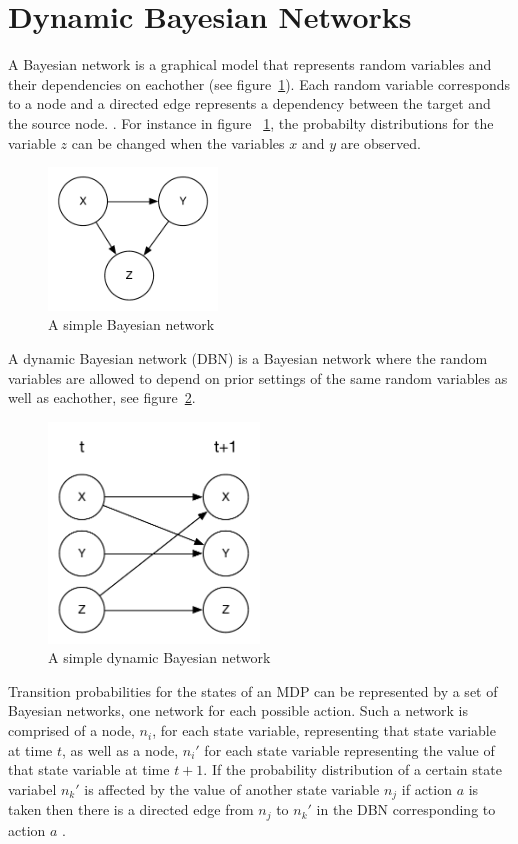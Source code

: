 \section{Dynamic Bayesian Networks }

A Bayesian network is a graphical model that represents random variables and their dependencies on eachother (see figure~\ref{fig:bn}). Each random variable corresponds to a node and a directed edge represents a dependency between the target and the source node. \parencite{heckerman1998tutorial}. For instance in figure ~\ref{fig:bn}, the probabilty distributions for the variable $z$ can be changed when the variables $x$ and $y$ are observed. 

\begin{figure}[H]
\centering
\includegraphics[width=0.4\textwidth]{images/BN.pdf}
\caption{A simple Bayesian network}
\label{fig:bn}
\end{figure}

A dynamic Bayesian network (DBN) is a Bayesian network where the random variables are allowed to depend on prior settings of the same random variables as well as eachother, see figure~\ref{fig:dbn}.


\begin{figure}[H]
    \centering
    \includegraphics[width=0.5\textwidth]{images/DBN.pdf}
    \caption{A simple dynamic Bayesian network}
    \label{fig:dbn}
\end{figure}

Transition probabilities for the states of an MDP can be represented by a set of Bayesian networks, one network for each possible action. Such a network is comprised of a node, $n_i$, for each state variable, representing that state variable at time $t$, as well as a node, $n_i'$ for each state variable representing the value of that state variable at time $t+1$. If the probability distribution of a certain state variabel $n_k'$ is affected by the value of another state variable $n_j$ if action $a$ is taken then there is a directed edge from $n_j$ to $n_k'$ in the DBN corresponding to action $a$ \parencite{guestrin2003efficient}.